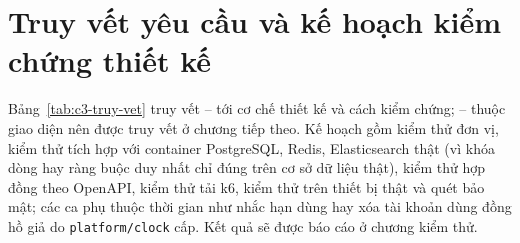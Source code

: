 \section{Truy vết yêu cầu và kế hoạch kiểm chứng thiết kế}\label{sec:truy-vet-thiet-ke}

Bảng~\ref{tab:c3-truy-vet} truy vết -- tới cơ chế thiết kế và cách kiểm chứng; -- thuộc giao diện nên được truy vết ở chương tiếp theo. Kế hoạch gồm kiểm thử đơn vị, kiểm thử tích hợp với container PostgreSQL, Redis, Elasticsearch thật (vì khóa dòng hay ràng buộc duy nhất chỉ đúng trên cơ sở dữ liệu thật), kiểm thử hợp đồng theo OpenAPI, kiểm thử tải k6, kiểm thử trên thiết bị thật và quét bảo mật; các ca phụ thuộc thời gian như nhắc hạn dùng hay xóa tài khoản dùng đồng hồ giả do \texttt{platform/clock} cấp. Kết quả sẽ được báo cáo ở chương kiểm thử.

